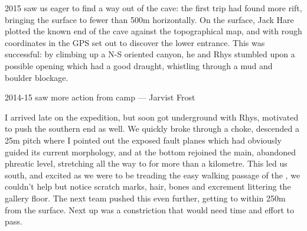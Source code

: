 2015 saw us eager to find a way out of the cave: the first trip had found more rift, bringing the surface to fewer than 500m horizontally. On the surface, Jack Hare plotted the known end of the cave against the topographical map, and with rough coordinates in the GPS set out to discover the lower entrance. This was successful: by climbing up a N-S oriented canyon, he and Rhys stumbled upon a possible opening which had a good draught, whistling through a mud and boulder blockage. 

\begin{marginfigure}
	\checkoddpage \ifoddpage \forcerectofloat \else \forceversofloat \fi
	\centering	{} 
  	\caption{2014-15 saw more action from camp \protect{}--- Jarvist Frost}
	\end{marginfigure}

I arrived late on the expedition, but soon got underground with Rhys, motivated to push the southern end as well. We quickly broke through a choke, descended a 25m pitch where I pointed out the exposed fault planes which had obviously guided its current morphology, and at the bottom rejoined the main, abandoned phreatic level, stretching all the way to  for more than a kilometre. This led us south, and excited as we were to be treading the easy walking passage of the , we couldn't help but notice scratch marks, hair, bones and excrement littering the gallery floor. The next team pushed this even further, getting to within 250m from the surface. Next up was a constriction that would need time and effort to pass.

